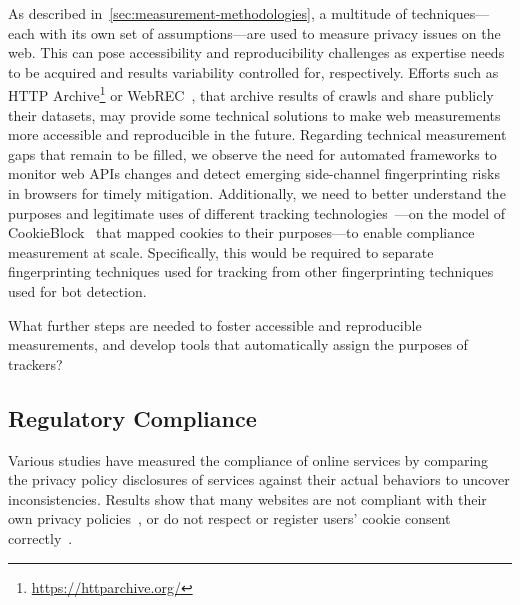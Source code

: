 As described in~\autoref{sec:measurement-methodologies}, a multitude of techniques---each with its own set of assumptions---are used to measure privacy issues on the web. This can pose accessibility and reproducibility challenges as expertise needs to be acquired and results variability controlled for, respectively.
%
Efforts such as HTTP Archive\footnote{\url{https://httparchive.org/}} or WebREC~\cite{hantkeWebExecutionBundles2025}, that archive results of crawls and share publicly their datasets, may provide some technical solutions to make web measurements more accessible and reproducible in the future.
%
Regarding technical measurement gaps that remain to be filled, we observe the need for automated frameworks to monitor web APIs changes and detect emerging side-channel fingerprinting risks in browsers for timely mitigation. Additionally, we need to better understand the purposes and legitimate uses of different tracking technologies~\cite{tothContributionPublicConsultation2020}---on the model of CookieBlock~\cite{bollingerAutomatingCookieConsent2022} that mapped cookies to their purposes---to enable compliance measurement at scale. Specifically, this would be required to separate fingerprinting techniques used for tracking from other fingerprinting techniques used for bot detection. 

\begin{opbox}
What further steps are needed to foster accessible and reproducible measurements, and develop tools that automatically assign the purposes of trackers?
\end{opbox}


\subsection{Regulatory Compliance}
\label{sec:compliance}

Various studies have measured the compliance of online services by comparing the privacy policy disclosures of services against their actual behaviors to uncover inconsistencies. Results show that many websites are not compliant with their own privacy policies~\cite{libertAutomatedApproachAuditing2018,ouViopolicyDetectorAutomatedApproach2022}, or do not respect or register users’ cookie consent correctly~\cite{carpinetoAutomaticAssessmentWebsite2016,sanchezrolaCanIOptOutYet2019,matteCookieBannersRespect2020,mehrnezhadCrossPlatformEvaluationPrivacy2020,bouhoulaAutomatedLargeScaleAnalysis2024,vannortwickSettingBarLow2022,birrellSoKTechnicalImplementation2024,Kanc-etal-25-PETs}. 



